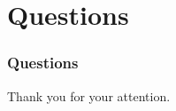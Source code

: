 \documentclass[aspectratio=169]{beamer}
\begin{document}

\section{Questions}

\begin{frame}
	\frametitle{Questions}

	\begin{center}
	Thank you for your attention.
	\end{center}

\vspace{0.5cm}

	\begin{center}
	\end{center}
\end{frame}
\end{document}
